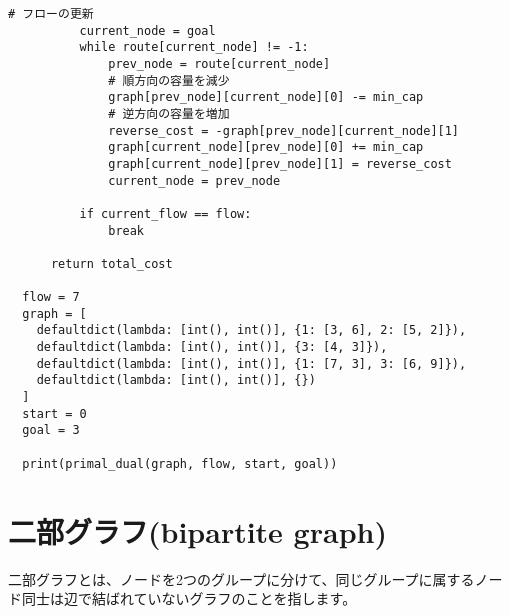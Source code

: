 \begin{lstlisting}[caption=プライマル・デュアル法の実装, label=primal_dual, frame=TRBL, label={primal_dual}]
          # フローの更新
          current_node = goal
          while route[current_node] != -1:
              prev_node = route[current_node]
              # 順方向の容量を減少
              graph[prev_node][current_node][0] -= min_cap 
              # 逆方向の容量を増加
              reverse_cost = -graph[prev_node][current_node][1]
              graph[current_node][prev_node][0] += min_cap 
              graph[current_node][prev_node][1] = reverse_cost
              current_node = prev_node
  
          if current_flow == flow:
              break
  
      return total_cost
  
  flow = 7
  graph = [
    defaultdict(lambda: [int(), int()], {1: [3, 6], 2: [5, 2]}),
    defaultdict(lambda: [int(), int()], {3: [4, 3]}),
    defaultdict(lambda: [int(), int()], {1: [7, 3], 3: [6, 9]}),
    defaultdict(lambda: [int(), int()], {})
  ]
  start = 0
  goal = 3
  
  print(primal_dual(graph, flow, start, goal))
\end{lstlisting}

\newpage

\section{二部グラフ(bipartite graph)}
二部グラフとは、ノードを2つのグループに分けて、同じグループに属するノード同士は辺で結ばれていないグラフのことを指します。

\vspace{0.5cm}

\begin{center}
\end{center}

